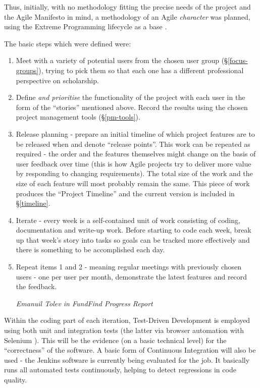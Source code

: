Thus, initially, with no methodology fitting the precise needs of the project and the Agile Manifesto \cite{agile-manifesto} in mind, a methodology of an Agile \emph{character} was planned, using the Extreme Programming lifecycle as a base \cite{xp-lifecycle}.

The basic steps which were defined were:
\begin{shadequote}
\begin{enumerate}
	\item Meet with a variety of potential users from the chosen user group (\S\ref{focus-groups}), trying to pick them so that each one has a different professional perspective on scholarship.
	\item Define \emph{and prioritise} the functionality of the project with each user in the form of the ``stories'' mentioned above. Record the results using the chosen project management tools (\S\ref{pm-tools}).
	\item Release planning - prepare an initial timeline of which project features are to be released when and denote ``release points''. This work can be repeated as required - the order and the features themselves might change on the basis of user feedback over time (this is how Agile projects try to deliver more value by responding to changing requirements). The total size of the work and the size of each feature will most probably remain the same. This piece of work produces the ``Project Timeline'' and the current version is included in \S\ref{timeline}.
	\item Iterate - every week is a self-contained unit of work consisting of coding, documentation and write-up work. Before starting to code each week, break up that week's story into tasks so goals can be tracked more effectively and there is something to be accomplished each day.
	\item Repeat items 1 and 2 - meaning regular meetings with previously chosen users - one per user per month, demonstrate the latest features and record the feedback.
	
	\par\emph{Emanuil Tolev in FundFind Progress Report \cite{progress-report}}
\end{enumerate}
\end{shadequote}

Within the coding part of each iteration, Test-Driven Development is employed using both unit and integration tests (the latter via browser automation with Selenium \cite{selenium}). This will be the evidence (on a basic technical level) for the ``correctness'' of the software. A basic form of Continuous Integration \cite{ci} will also be used - the Jenkins \cite{jenkins} software is currently being evaluated for the job. It basically runs all automated tests continuously, helping to detect regressions in code quality.

